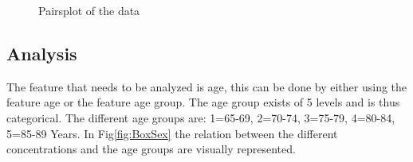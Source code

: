 \documentclass{article}
\begin{document}
      \begin{figure}
          \centering
          \caption{Pairsplot of the data}
          \label{fig:Pairs}
      \end{figure}

    \subsection{Analysis}
      The feature that needs to be analyzed is age, this can be done by either using the feature age or the feature age group.
      The age group exists of 5 levels and is thus categorical.
      The different age groups are: 1=65-69, 2=70-74, 3=75-79, 4=80-84, 5=85-89 Years.
      In Fig\ref{fig:BoxSex} the relation between the different concentrations and the age groups are visually represented.
\end{document}
